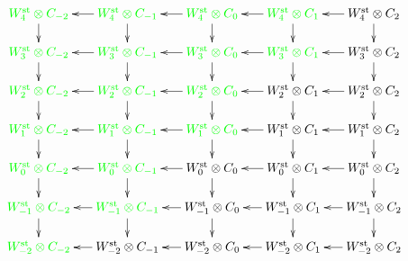 \[
	\xymatrix@R=.5cm@C=.5cm{
		\green{\Wst[4]\otimes C_{-2}}\ar[d] &
		\green{\Wst[4]\otimes C_{-1}}\ar[d]\ar[l] &
		\green{\Wst[4]\otimes C_{0}}\ar[d]\ar[l] &
		\green{\Wst[4]\otimes C_{1}}\ar[d]\ar[l] &
		\Wst[4]\otimes C_{2}\ar[d]\ar[l]
		\\
		\green{\Wst[3]\otimes C_{-2}}\ar[d] &
		\green{\Wst[3]\otimes C_{-1}}\ar[d]\ar[l] &
		\green{\Wst[3]\otimes C_{0}}\ar[d]\ar[l] &
		\green{\Wst[3]\otimes C_{1}}\ar[d]\ar[l] &
		\Wst[3]\otimes C_{2}\ar[d]\ar[l]
		\\
		\green{\Wst[2]\otimes C_{-2}}\ar[d] &
		\green{\Wst[2]\otimes C_{-1}}\ar[d]\ar[l] &
		\green{\Wst[2]\otimes C_{0}}\ar[d]\ar[l] &
		\Wst[2]\otimes C_{1}\ar[d]\ar[l] &
		\Wst[2]\otimes C_{2}\ar[d]\ar[l]
		\\
		\green{\Wst[1]\otimes C_{-2}}\ar[d] &
		\green{\Wst[1]\otimes C_{-1}}\ar[d]\ar[l] &
		\green{\Wst[1]\otimes C_{0}}\ar[d]\ar[l] &
		\Wst[1]\otimes C_{1}\ar[d]\ar[l] &
		\Wst[1]\otimes C_{2}\ar[d]\ar[l]
		\\
		\green{\Wst[0]\otimes C_{-2}}\ar[d] &
		\green{\Wst[0]\otimes C_{-1}}\ar[d]\ar[l] &
		\Wst[0]\otimes C_{0}\ar[d]\ar[l] &
		\Wst[0]\otimes C_{1}\ar[d]\ar[l] &
		\Wst[0]\otimes C_{2}\ar[d]\ar[l]
		\\
		\green{\Wst[-1]\otimes C_{-2}}\ar[d] &
		\green{\Wst[-1]\otimes C_{-1}}\ar[d]\ar[l] &
		\Wst[-1]\otimes C_{0}\ar[d]\ar[l] &
		\Wst[-1]\otimes C_{1}\ar[d]\ar[l] &
		\Wst[-1]\otimes C_{2}\ar[d]\ar[l]
		\\
		\green{\Wst[-2]\otimes C_{-2}} &
		\Wst[-2]\otimes C_{-1}\ar[l] &
		\Wst[-2]\otimes C_{0}\ar[l] &
		\Wst[-2]\otimes C_{1}\ar[l] &
		\Wst[-2]\otimes C_{2}\ar[l]
}
\]